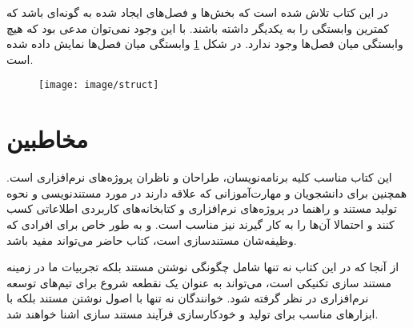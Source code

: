 
در این کتاب تلاش شده است که بخش‌ها و فصل‌های ایجاد شده به گونه‌ای باشد که کمترین
وابستگی را به یکدیگر داشته باشند. با این وجود نمی‌توان مدعی بود که هیچ وابستگی
میان فصل‌ها وجود ندارد. در شکل \ref{image/struct}
وابستگی میان فصل‌ها نمایش داده شده است.

\begin{figure}
\centering
\texttt{[image: image/struct]}
\label{image/struct}
\end{figure}


\section{مخاطبین}

این کتاب مناسب کلیه برنامه‌نویسان، طراحان و ناظران پروژه‌های نرم‌افزاری است.
همچنین برای دانشجویان و مهارت‌آموزانی که علاقه دارند در مورد مستندنویسی و نحوه
تولید مستند و راهنما در پروژه‌های نرم‌افزاری و کتابخانه‌های کاربردی اطلاعاتی کسب
کنند و احتمالا آن‌ها را به کار گیرند نیز مناسب است. و به طور خاص برای افرادی که
وظیفه‌شان مستندسازی است، کتاب حاضر می‌تواند مفید باشد.

از آنجا که در این کتاب نه تنها شامل چگونگی نوشتن مستند بلکه تجربیات ما در زمینه
مستند سازی تکنیکی است، می‌تواند به عنوان یک نقطعه شروع برای تیم‌های توسعه
نرم‌افزاری در نظر گرفته شود. خوانندگان نه تنها با اصول نوشتن مستند بلکه با
ابزارهای مناسب برای تولید و خودکارسازی فرآیند مستند سازی اشنا خواهند شد.


